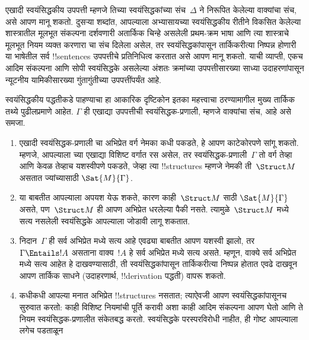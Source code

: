 \documentclass[../../../include/open-logic-section]{subfiles}
\begin{document}
\begin{explain}
एखादी स्वयंसिद्धकीय उपपत्ती म्हणजे तिच्या स्वयंसिद्धकांच्या संच~$\Delta$
ने निरूपित केलेल्या वाक्यांचा संच, असे आपण मानू शकतो. दुसऱ्या शब्दांत,
आपल्याला अभ्यासायच्या स्वयंसिद्धकीय रीतीने विकसित केलेल्या शास्त्रातील
मूलभूत संकल्पना दर्शवणारी अतार्किक चिन्हे असलेली प्रथम-क्रम भाषा आणि त्या
शास्त्राचे मूलभूत नियम व्यक्त करणारा चा संच दिलेला असेल,
तर स्वयंसिद्धकांपासून तार्किकरीत्या निष्पन्न होणारी या भाषेतील सर्व
!!{sentence}s उपपत्तीचे प्रतिनिधित्व करतात असे आपण मानू शकतो. याची व्याप्ती,
एकच आदिम संकल्पना आणि सोपी स्वयंसिद्धके असलेल्या अंशतः क्रमांच्या
उपपत्तीसारख्या साध्या उदाहरणांपासून न्यूटनीय यामिकीसारख्या गुंतागुंतीच्या
उपपत्तींपर्यंत आहे.

स्वयंसिद्धकीय पद्धतीकडे पाहण्याचा हा आकारिक दृष्टिकोन इतका महत्त्वाचा
ठरण्यामागील मुख्य तार्किक तथ्ये पुढीलप्रमाणे आहेत. $\Gamma$ ही एखाद्या
उपपत्तीची स्वयंसिद्धक-प्रणाली, म्हणजे वाक्यांचा संच, आहे असे समजा.
\begin{enumerate}
\item एखादी स्वयंसिद्धक-प्रणाली चा अभिप्रेत वर्ग नेमका कधी
  पकडते, हे आपण काटेकोरपणे सांगू शकतो. म्हणजे, आपल्याला च्या
  एखाद्या विशिष्ट वर्गात रस असेल, तर स्वयंसिद्धक-प्रणाली~$\Gamma$ तो वर्ग
  तेव्हा आणि केवळ तेव्हाच यशस्वीपणे पकडते, जेव्हा त्या !!{structure}s म्हणजे
  नेमकी ती~$\Struct M$ असतात ज्यांच्यासाठी $\Sat{M}{\Gamma}$.
\item या बाबतीत आपल्याला अपयश येऊ शकते, कारण काही~$\Struct M$ साठी
  $\Sat{M}{\Gamma}$ असते, पण~$\Struct M$ ही आपण अभिप्रेत धरलेल्या
  पैकी नसते. त्यामुळे~$\Struct M$ मध्ये सत्य नसलेली
  स्वयंसिद्धके आपल्याला जोडावी लागू शकतात.
\item निदान~$\Gamma$ ही सर्व अभिप्रेत मध्ये सत्य आहे एवढ्या
  बाबतीत आपण यशस्वी झालो, तर $\Gamma \Entails !A$ असताना वाक्य~$!A$ हे
  सर्व अभिप्रेत मध्ये सत्य असते. म्हणून, वाक्ये सर्व
  अभिप्रेत मध्ये सत्य आहेत हे दाखवण्यासाठी, ती
  स्वयंसिद्धकांपासून तार्किकरीत्या निष्पन्न होतात एवढे दाखवून आपण तार्किक
  साधने (उदाहरणार्थ, !!{derivation} पद्धती) वापरू शकतो.
\item कधीकधी आपल्या मनात अभिप्रेत !!{structure}s नसतात; त्याऐवजी आपण
  स्वयंसिद्धकांपासूनच सुरुवात करतो: काही विशिष्ट नियमांची पूर्ति करावी अशा
  काही आदिम संकल्पना आपण घेतो आणि ते नियम स्वयंसिद्धक-प्रणालीत संकेतबद्ध
  करतो. स्वयंसिद्धके परस्परविरोधी नाहीत, ही गोष्ट आपल्याला लगेच पडताळून

\end{enumerate}
\end{explain}
\end{document}
